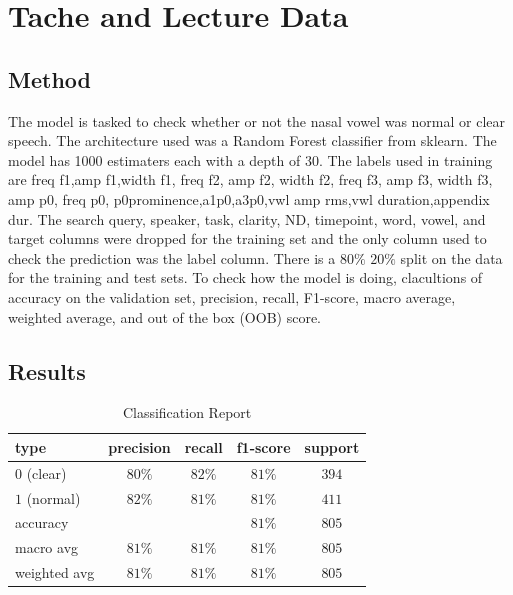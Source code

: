 \documentclass[12pt]{article}
\begin{document}
    \section*{Tache and Lecture Data}
    \subsection*{Method}
    \indent
    \indent
    The model is tasked to check whether or not the nasal vowel was normal or
    clear speech. The architecture used was a Random Forest classifier from sklearn.
    The model has 1000 estimaters each with a depth of 30. The labels used in
    training are freq f1,amp f1,width f1, freq f2, amp f2, width f2, freq f3, amp
    f3, width f3, amp p0, freq p0, p0prominence,a1p0,a3p0,vwl amp rms,vwl duration,appendix
    dur. The search query, speaker, task, clarity, ND, timepoint, word, vowel,
    and target columns were dropped for the training set and the only column
    used to check the prediction was the label column. There is a $80\%$ $20\%$ split
    on the data for the training and test sets. To check how the model is doing, clacultions
    of accuracy on the validation set, precision, recall, F1-score, macro average,
    weighted average, and out of the box (OOB) score.

    \subsection*{Results}
    \begin{table}[ht!]
        \centering
        \caption{Classification Report}
        \label{table:tache_lecture_report}
        \begin{tabular}{|l|c|c|c|c|}
            \hline
            \textbf{type} & \textbf{precision} & \textbf{recall} & \textbf{f1-score} & \textbf{support} \\
            \hline
            \hline
            $0$ (clear)   & $80\%$             & $82\%$          & $81\%$            & $394$            \\
            \hline
            $1$ (normal)  & $82\%$             & $81\%$          & $81\%$            & $411$            \\
            \hline
            accuracy      &                    &                 & $81\%$            & $805$            \\
            \hline
            macro avg     & $81\%$             & $81\%$          & $81\%$            & $805$            \\
            \hline
            weighted avg  & $81\%$             & $81\%$          & $81\%$            & $805$            \\
            \hline
        \end{tabular}
    \end{table}
\end{document}
